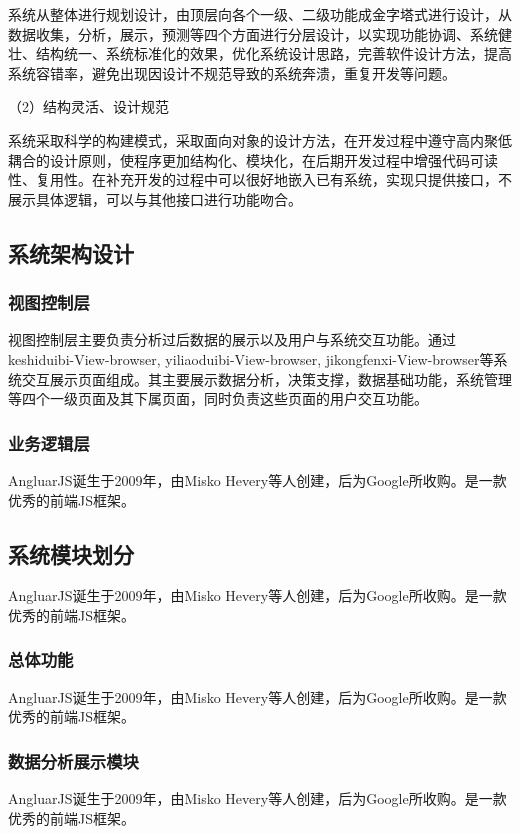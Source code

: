 \documentclass{husethesis}
\begin{document}
系统从整体进行规划设计，由顶层向各个一级、二级功能成金字塔式进行设计，从数据收集，分析，展示，预测等四个方面进行分层设计，以实现功能协调、系统健壮、结构统一、系统标准化的效果，优化系统设计思路，完善软件设计方法，提高系统容错率，避免出现因设计不规范导致的系统奔溃，重复开发等问题。

（2）结构灵活、设计规范

系统采取科学的构建模式，采取面向对象的设计方法，在开发过程中遵守高内聚低耦合的设计原则，使程序更加结构化、模块化，在后期开发过程中增强代码可读性、复用性。在补充开发的过程中可以很好地嵌入已有系统，实现只提供接口，不展示具体逻辑，可以与其他接口进行功能吻合。

\subsection{系统架构设计}

\subsubsection{视图控制层}
视图控制层主要负责分析过后数据的展示以及用户与系统交互功能。通过keshiduibi-View-browser, yiliaoduibi-View-browser, jikongfenxi-View-browser等系统交互展示页面组成。其主要展示数据分析，决策支撑，数据基础功能，系统管理等四个一级页面及其下属页面，同时负责这些页面的用户交互功能。

\subsubsection{业务逻辑层}
AngluarJS诞生于2009年，由Misko Hevery等人创建，后为Google所收购。是一款优秀的前端JS框架。

\subsection{系统模块划分}
AngluarJS诞生于2009年，由Misko Hevery等人创建，后为Google所收购。是一款优秀的前端JS框架。

\subsubsection{总体功能}
AngluarJS诞生于2009年，由Misko Hevery等人创建，后为Google所收购。是一款优秀的前端JS框架。

\subsubsection{数据分析展示模块}
AngluarJS诞生于2009年，由Misko Hevery等人创建，后为Google所收购。是一款优秀的前端JS框架。
\end{document}
